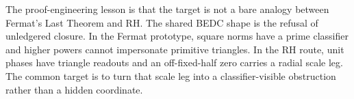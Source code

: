 \begin{principle}
\label{prin:rh-fermat-prototype-proof-engineering-route}
The proof-engineering lesson is that the target is not a bare analogy
between Fermat's Last Theorem and RH.  The shared BEDC shape is the
refusal of unledgered closure.  In the Fermat prototype, square norms
have a prime classifier and higher powers cannot impersonate primitive
triangles.  In the RH route, unit phases have triangle readouts and an
off-fixed-half zero carries a radial scale leg.  The common target is to
turn that scale leg into a classifier-visible obstruction rather than a
hidden coordinate.
\end{principle}
